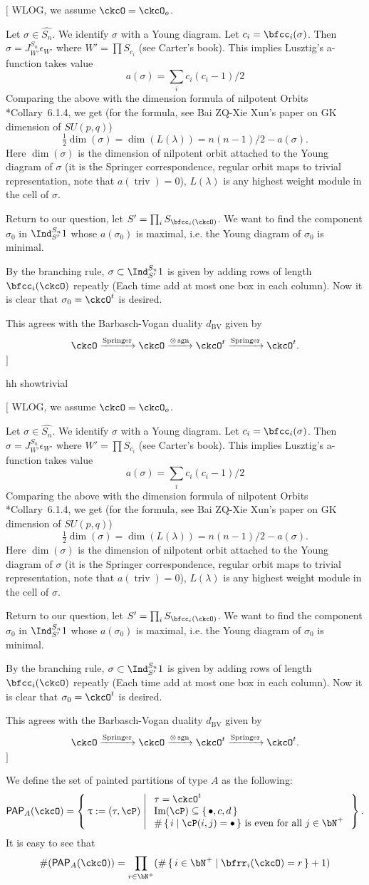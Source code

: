 \documentclass[12pt,a4paper]{amsart}
\newcommand{\trivial}[2][]{\if\relax\detokenize{#1}\relax
  {%
      \color{orange} \vspace{0em} $[$  #2 $]$
      \color{black}
  }
  \else
\ifx#1h
\ifcsname showtrivial\endcsname
{%
    \color{orange} \vspace{0em}  $[$ #2 $]$
    \color{black}
}
\fi
\else {\red Wrong argument!} \fi
\fi
}
\def\Im{\operatorname{Im}}
\def\abs#1{\left|{#1}\right|}
\newcommand{\sgn}{\operatorname{sgn}}
\newcommand{\triv}{\operatorname{triv}}
\numberwithin{equation}{section}
\theoremstyle{remark}
\def\half{{\tfrac{1}{2}}}
\def\dBV{d_{\mathrm{BV}}}
\def\lamck{\lambda_\ckcO}
\def\Wint#1{W_{[#1]}}
\def\PP{\mathsf{PAP}}
\def\Im{\mathrm{Im}}
\def\Spr{\mathrm{Springer}}
\begin{document}
\trivial[h]{ WLOG, we assume $\ckcO = \ckcO_o$.

  Let $\sigma\in \widehat{S_n}$. We identify $\sigma$ with a Young diagram. Let
  $c_i = \bfcc_i(\sigma)$. Then $\sigma = J^{S_n}_{W'} \epsilon_{W'}$ where
  $W' = \prod S_{c_i}$ (see Carter's book). This implies Lusztig's a-function
  takes value
  \[
    a(\sigma) = \sum_i c_i(c_i-1) /2
  \]
  Comparing the above with the dimension formula of nilpotent Orbits
  \cite{CM}*{Collary~6.1.4}, we get (for the formula, see Bai ZQ-Xie Xun's paper
  on GK dimension of $SU(p,q)$)
  \[
    \half \dim(\sigma) = \dim(L(\lambda)) = n(n-1)/2 - a(\sigma).
  \]
  Here $\dim(\sigma)$ is the dimension of nilpotent orbit attached to the Young
  diagram of $\sigma$ (it is the Springer correspondence, regular orbit maps to
  trivial representation, note that $a(\triv)=0$), $L(\lambda)$ is any highest
  weight module in the cell of $\sigma$.


  Return to our question, let $S' = \prod_i S_{\bfcc_i(\ckcO)}$. We want to find
  the component $\sigma_0$ in $\Ind_{S'}^{S_n} 1$ whose $a(\sigma_0)$ is
  maximal, i.e. the Young diagram of $\sigma_0$ is minimal.

  By the branching rule, $\sigma \subset \Ind_{S'}^{S_n} 1$ is given by adding
  rows of length $\bfcc_i(\ckcO)$ repeatly (Each time add at most one box in
  each column). Now it is clear that $\sigma_0 = \ckcO^t$ is desired.

  This agrees with the Barbasch-Vogan duality $\dBV$ given by
  \[
    \ckcO \xrightarrow{\Spr}\ckcO \xrightarrow{\otimes \sgn} \ckcO^t \xrightarrow{\Spr} \ckcO^t.
  \]
}

We define the set of painted partitions of type $A$ as the following:
\begin{equation}\label{eq:PP.AR}
  \PP_{A}(\ckcO) = \Set{\uptau:=(\tau, \cP)|
    \begin{array}{l}
      \text{$\tau = \ckcO^{t}$}\\
      \text{$\Im(\cP)\subseteq \set{\bullet,c,d}$}\\
      \text{$\#\set{i|\cP(i,j)=\bullet}$ is even for all $j\in \bN^{+}$}
    \end{array}
  }.
\end{equation}
It is easy to see that
\begin{equation}\label{eq:PPA.count}
  \#(\PP_{A}(\ckcO)) = \prod_{r\in \bN^{+}} (\#\set{i\in \bN^{+}| \bfrr_{i}(\ckcO)=r}+1)
\end{equation}
\end{document}
